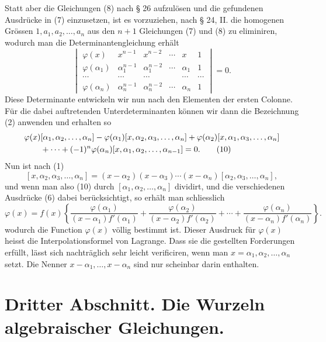 \documentclass[11pt]{article}
\begin{document}
Statt aber die Gleichungen (8) nach § 26 aufzulösen und die gefundenen Ausdrücke in (7) einzusetzen, ist es vorzuziehen, nach § 24, II. die homogenen Grössen $1,a_1,a_2,\ldots,a_n$ aus den $n+1$ Gleichungen (7) und (8) zu eliminiren, wodurch man die Determinantengleichung erhält
\[
\begin{vmatrix}
 \varphi(x)&x^{n-1}&x^{n-2}&\cdots&x&1\\
 \varphi(\alpha_1)&\alpha_1^{n-1}&\alpha_1^{n-2}&\cdots&\alpha_1&1\\
 \cdots&\cdots&\cdots&&\cdots&\cdots\\
 \varphi(\alpha_n)&\alpha_n^{n-1}&\alpha_n^{n-2}&\cdots&\alpha_n&1
\end{vmatrix}=0.\tag{9}
\]
Diese Determinante entwickeln wir nun nach den Elementen der ersten Colonne. Für die dabei auftretenden Unterdeterminanten können wir dann die Bezeichnung (2) anwenden und erhalten so
\begin{align}
&\varphi(x)[\alpha_1,\alpha_2,\ldots,\alpha_n]
-\varphi(\alpha_1)[x,\alpha_2,\alpha_3,\ldots,\alpha_n]
+\varphi(\alpha_2)[x,\alpha_1,\alpha_3,\ldots,\alpha_n]
\notag\\
&\qquad+\cdots+(-1)^n\varphi(\alpha_n)[x,\alpha_1,\alpha_2,\ldots,\alpha_{n-1}]=0.\tag{10}
\end{align}
Nun ist nach (1)
\[
 [x,\alpha_2,\alpha_3,
 \ldots,\alpha_n]=(x-\alpha_2)(x-\alpha_3)\cdots(x-\alpha_n)[\alpha_2,\alpha_3,
 \ldots,\alpha_n],
\]
und wenn man also (10) durch $[\alpha_1,\alpha_2,\ldots,\alpha_n]$ dividirt, und die verschiedenen Ausdrücke (6) dabei berücksichtigt, so erhält man schliesslich
\begin{equation}
 \varphi(x)=f(x)\left\{\frac{\varphi(\alpha_1)}{(x-\alpha_1)f'(\alpha_1)}+\frac{\varphi(\alpha_2)}{(x-\alpha_2)f'(\alpha_2)}+\cdots+\frac{\varphi(\alpha_n)}{(x-\alpha_n)f'(\alpha_n)}\right\}.\tag{11}
\end{equation}
wodurch die Function $\varphi(x)$ völlig bestimmt ist. Dieser Ausdruck für $\varphi(x)$ heisst die Interpolationsformel von Lagrange. Dass sie die gestellten Forderungen erfüllt, lässt sich nachträglich sehr leicht verificiren, wenn man $x=\alpha_1,\alpha_2,
\ldots,\alpha_n$ setzt. Die Nenner $x-\alpha_1,\ldots,x-\alpha_n$ sind nur scheinbar darin enthalten.




\section*{Dritter Abschnitt. Die Wurzeln algebraischer Gleichungen.}
\end{document}
